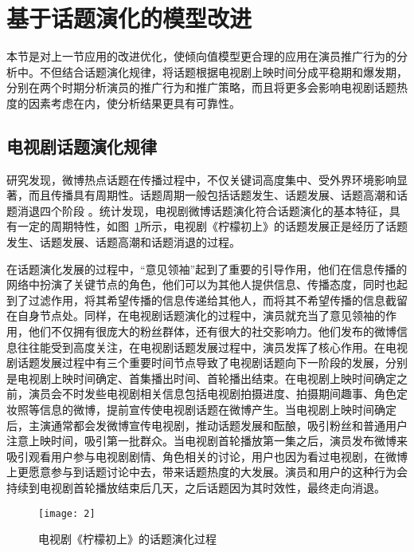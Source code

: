 \section{基于话题演化的模型改进}

本节是对上一节应用的改进优化，使倾向值模型更合理的应用在演员推广行为的分析中。不但结合话题演化规律，将话题根据电视剧上映时间分成平稳期和爆发期，分别在两个时期分析演员的推广行为和推广策略，而且将更多会影响电视剧话题热度的因素考虑在内，使分析结果更具有可靠性。

\subsection{电视剧话题演化规律}

研究发现，微博热点话题在传播过程中，不仅关键词高度集中、受外界环境影响显著，而且传播具有周期性。话题周期一般包括话题发生、话题发展、话题高潮和话题消退四个阶段 \cite{赵龙文2013基于意见领袖参与行为的微博话题热度预测研究}。统计发现，电视剧微博话题演化符合话题演化的基本特征，具有一定的周期特性，如图~\ref{ning}所示，电视剧《柠檬初上》的话题发展正是经历了话题发生、话题发展、话题高潮和话题消退的过程。

在话题演化发展的过程中，“意见领袖”起到了重要的引导作用，他们在信息传播的网络中扮演了关键节点的角色，他们可以为其他人提供信息、传播态度，同时也起到了过滤作用，将其希望传播的信息传递给其他人，而将其不希望传播的信息截留在自身节点处。同样，在电视剧话题演化的过程中，演员就充当了意见领袖的作用，他们不仅拥有很庞大的粉丝群体，还有很大的社交影响力。他们发布的微博信息往往能受到高度关注，在电视剧话题发展过程中，演员发挥了核心作用。在电视剧话题发展过程中有三个重要时间节点导致了电视剧话题向下一阶段的发展，分别是电视剧上映时间确定、首集播出时间、首轮播出结束。在电视剧上映时间确定之前，演员会不时发些电视剧相关信息包括电视剧拍摄进度、拍摄期间趣事、角色定妆照等信息的微博，提前宣传使电视剧话题在微博产生。当电视剧上映时间确定后，主演通常都会发微博宣传电视剧，推动话题发展和酝酿，吸引粉丝和普通用户注意上映时间，吸引第一批群众。当电视剧首轮播放第一集之后，演员发布微博来吸引观看用户参与电视剧剧情、角色相关的讨论，用户也因为看过电视剧，在微博上更愿意参与到话题讨论中去，带来话题热度的大发展。演员和用户的这种行为会持续到电视剧首轮播放结束后几天，之后话题因为其时效性，最终走向消退。

\begin{figure}[!htbp]
\centering
\texttt{[image: 2]}
\caption{电视剧《柠檬初上》的话题演化过程}
\label{ning}
\end{figure}

